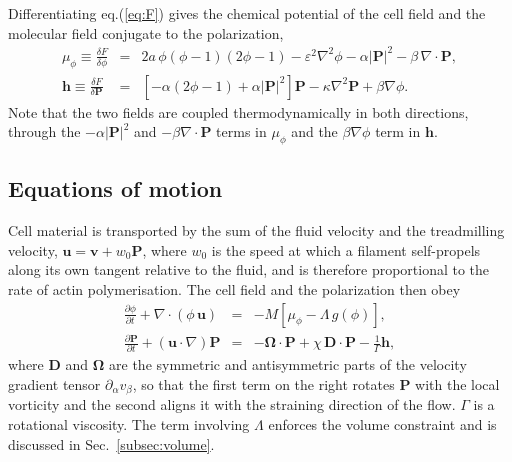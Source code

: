 \documentclass[11pt]{article}
\begin{document}
Differentiating eq.(\ref{eq:F}) gives the chemical potential of the cell field
and the molecular field conjugate to the polarization,
\begin{eqnarray}\label{eq:mu_h}
\mu_\phi\equiv\frac{\delta F}{\delta\phi}&=&2a\,\phi(\phi-1)(2\phi-1)
-\varepsilon^{2}\nabla^{2}\phi-\alpha|\mathbf{P}|^{2}
-\beta\,\nabla\cdot\mathbf{P},\nonumber\\
\mathbf{h}\equiv\frac{\delta F}{\delta\mathbf{P}}
&=&\left[-\alpha(2\phi-1)+\alpha|\mathbf{P}|^{2}\right]\mathbf{P}
-\kappa\nabla^{2}\mathbf{P}+\beta\nabla\phi.
\end{eqnarray}
Note that the two fields are coupled thermodynamically in both directions,
through the $-\alpha|\mathbf{P}|^{2}$ and $-\beta\nabla\cdot\mathbf{P}$ terms in
$\mu_\phi$ and the $\beta\nabla\phi$ term in $\mathbf{h}$.

\noindent
\subsection{Equations of motion}
\label{subsec:eom}

Cell material is transported by the sum of the fluid velocity and the
treadmilling velocity, $\mathbf{u}=\mathbf{v}+w_{0}\mathbf{P}$, where $w_{0}$ is
the speed at which a filament self-propels along its own tangent relative to the
fluid, and is therefore proportional to the rate of actin polymerisation. The
cell field and the polarization then obey
\begin{eqnarray}\label{eq:eom}
\frac{\partial\phi}{\partial t}+\nabla\cdot\left(\phi\,\mathbf{u}\right)
&=&-M\left[\mu_\phi-\Lambda\,g(\phi)\right],\nonumber\\
\frac{\partial\mathbf{P}}{\partial t}
+\left(\mathbf{u}\cdot\nabla\right)\mathbf{P}
&=&-\mathbf{\Omega}\cdot\mathbf{P}+\chi\,\mathbf{D}\cdot\mathbf{P}
-\frac{1}{\Gamma}\mathbf{h},
\end{eqnarray}
where $\mathbf{D}$ and $\mathbf{\Omega}$ are the symmetric and antisymmetric
parts of the velocity gradient tensor $\partial_\alpha v_\beta$, so that the
first term on the right rotates $\mathbf{P}$ with the local vorticity and the
second aligns it with the straining direction of the flow. $\Gamma$ is a
rotational viscosity. The term involving $\Lambda$ enforces the volume
constraint and is discussed in Sec.~\ref{subsec:volume}.
\end{document}
